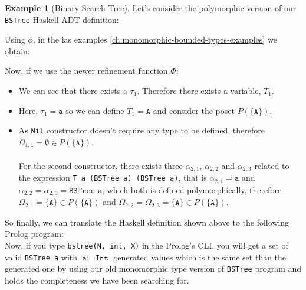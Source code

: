 \documentclass{report}
\theoremstyle{definition}
\newtheorem{example}{Example}[section]
\theoremstyle{definition}
\newcommand{\ttt}[1]{\texttt{#1}}
\begin{document}
	\begin{example}[Binary Search Tree]
		Let's consider the polymorphic version of our \ttt{BSTree} Haskell ADT definition:
		
		Using $\phi$, in the las examples \ref{ch:monomorphic-bounded-types-examples} we obtain:
		
		Now, if we use the newer refinement function $\Phi$:
		\begin{itemize}
			\item We can see that there exists a $\tau_1$. Therefore there exists a variable, $T_1$.
			\item Here, $\tau_1 = \ttt{a}$ so we can define $T_1 = \ttt{A}$ and consider the poset $P(\{\ttt{A}\})$.
			\item As \ttt{Nil} constructor doesn't require any type to be defined, therefore $\Omega_{1,1} = \emptyset \in P(\{ \ttt{A} \})$. \\\\
			      For the second constructor, there exists three $\alpha_{2,1}$, $\alpha_{2,2}$ and $\alpha_{2,3}$ related to the expression \ttt{T a (BSTree a) (BSTree a)}, that is $\alpha_{2,1} = \ttt{a}$ and $\alpha_{2,2} = \alpha_{2,3} = \ttt{BSTree a}$, which both is defined polymorphically, therefore $\Omega_{2,1} = \{\ttt{A}\} \in P(\{ \ttt{A} \})$ and $\Omega_{2,2} = \Omega_{2,3} = \{\ttt{A}\} \in P(\{ \ttt{A} \})$.
		\end{itemize}
		So finally, we can translate the Haskell definition shown above to the following Prolog program:\\
		
		Now, if you type \ttt{bstree(N, int, X)} in the Prolog's CLI, you will get a set of valid \ttt{BSTree a} with $\ttt{a} := \ttt{Int}$ generated values which is the same set than the generated one by using our old monomorphic type version of \ttt{BSTree} program and holds the completeness we have been searching for.\\
	\end{example}
\end{document}
